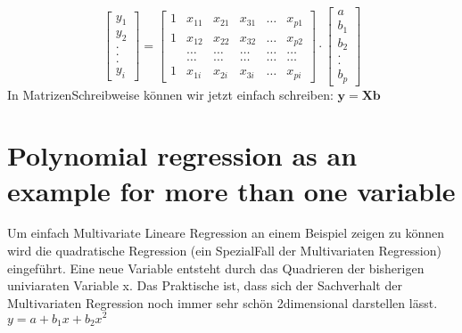 \documentclass[letterpaper,10pt,english]{jupyterBook}
\begin{document}
\begin{equation*}
     \begin{bmatrix}
      y_1\\
      y_2\\
      .  \\
      .  \\
      .  \\
      y_i
    \end{bmatrix}
    =
    \begin{bmatrix}
      1& x_{11} & x_{21} & x_{31} & \ldots & x_{p1}\\
      1 &  x_{12} & x_{22} & x_{32} & \ldots & x_{p2}\\
      &\ldots&\ldots&\ldots&\ldots&\ldots\\
      &\ldots&\ldots&\ldots&\ldots&\ldots\\
      1& x_{1i} & x_{2i} & x_{3i} & \ldots & x_{pi}
    \end{bmatrix}
    \cdot
    \begin{bmatrix}
      a\\
      b_1\\
      b_2\\
      .\\
      .\\
      b_p
    \end{bmatrix}
  \end{equation*}
\sphinxAtStartPar
In Matrizen\sphinxhyphen{}Schreibweise können wir jetzt einfach schreiben:
\(\mathbf{y} = \mathbf{X}\mathbf{b}\)


\chapter{Polynomial regression as an example for more than one variable}
\label{\detokenize{Regression_Techniques:polynomial-regression-as-an-example-for-more-than-one-variable}}
\sphinxAtStartPar
Um einfach Multivariate Lineare Regression an einem Beispiel zeigen zu können wird die quadratische Regression (ein Spezial\sphinxhyphen{}Fall der Multivariaten Regression) eingeführt. Eine neue Variable entsteht durch das Quadrieren der bisherigen univiaraten Variable x. Das Praktische ist, dass sich der Sachverhalt der Multivariaten Regression noch immer sehr schön 2\sphinxhyphen{}dimensional darstellen lässt.
\(y = a + b_1 x + b_2 x^2\)
\end{document}
